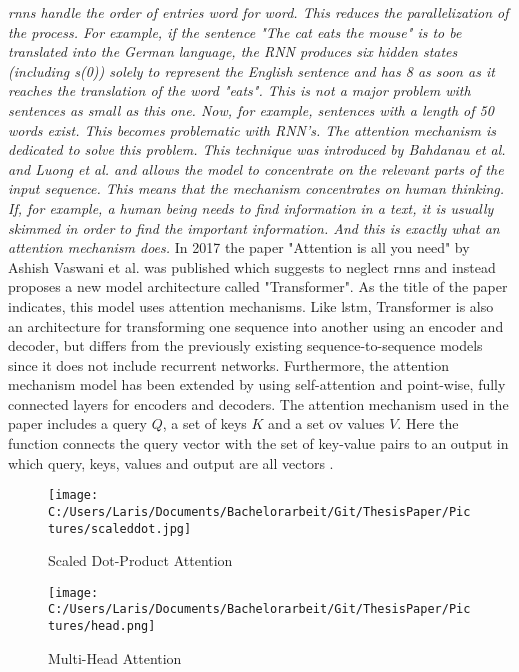 \documentclass[a4paper, 11pt,titlepage,oneside,openany]{book}
\begin{document}
\textit{\noindent \gls{rnn}s handle the order of entries word for word. This reduces the parallelization of the process. For example, if the sentence "The cat eats the mouse" is to be translated into the German language, the RNN produces six hidden states (including s(0)) solely to represent the English sentence and has 8 as soon as it reaches the translation of the word "eats". This is not a major problem with sentences as small as this one. Now, for example, sentences with a length of 50 words exist. This becomes problematic with RNN's. The attention mechanism is dedicated to solve this problem. This technique was introduced by Bahdanau et al. \cite{bahdnau} and Luong et al. \cite{lunong} and allows the model to concentrate on the relevant parts of the input sequence. This means that the mechanism concentrates on human thinking. If, for example, a human being needs to find information in a text, it is usually skimmed in order to find the important information. And this is exactly what an attention mechanism does. }
\newpage
In 2017 the paper "Attention is all you need" by Ashish Vaswani et al.  \cite{attention} was published which suggests to neglect \gls{rnn}s and instead proposes a new model architecture called "Transformer". As the title of the paper indicates, this model uses attention mechanisms. Like \gls{lstm}, Transformer is also an architecture for transforming one sequence into another using an encoder and decoder, but differs from the previously existing sequence-to-sequence models since it does not include recurrent networks. Furthermore, the attention mechanism model has been extended by using self-attention and point-wise, fully connected layers for encoders and decoders.
The attention mechanism used in the paper includes a query $Q$, a set of keys $K$ and a set ov values $V$. Here the function connects the query vector with the set of key-value pairs to an output in which query, keys, values and output are all vectors \cite{attention}.\\
\begin{figure}[t]
	\begin{minipage}[b]{0.5\linewidth}
		\texttt{[image: C:/Users/Laris/Documents/Bachelorarbeit/Git/ThesisPaper/Pictures/scaleddot.jpg]}
		\caption{Scaled Dot-Product Attention}
	\end{minipage}
	\hfill
	\begin{minipage}[b]{0.5\linewidth}
		\texttt{[image: C:/Users/Laris/Documents/Bachelorarbeit/Git/ThesisPaper/Pictures/head.png]}
		\caption{Multi-Head Attention}
	\end{minipage}
\end{figure}
\end{document}
